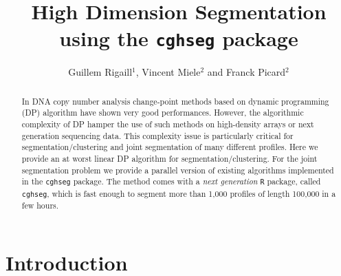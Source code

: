 \documentclass[11pt]{llncs}
\newcommand{\soft}{\texttt{cghseg}}
\begin{document}
\title{High Dimension Segmentation using the \texttt{cghseg} package}
%
%
\author{Guillem Rigaill$^1$, Vincent Miele$^2$ and Franck Picard$^2$}
%
%
%

\maketitle   

\begin{abstract}

In DNA copy number analysis change-point methods based on dynamic programming (DP) algorithm have shown very good performances.
However, the algorithmic complexity of DP hamper the use of such methods on high-density arrays or next generation sequencing data. 
This complexity issue is particularly critical for segmentation/clustering and joint segmentation of many different profiles.
Here we provide an at worst linear DP algorithm for segmentation/clustering.
For the joint segmentation problem we provide a parallel version of existing algorithms implemented in the \texttt{cghseg} package.
The method comes with a {\it next generation} \texttt{R} package, called \soft, which is fast enough to segment more than 1,000 profiles of length 100,000 in a few hours.

\end{abstract}


\newpage
\section{Introduction}
\end{document}
